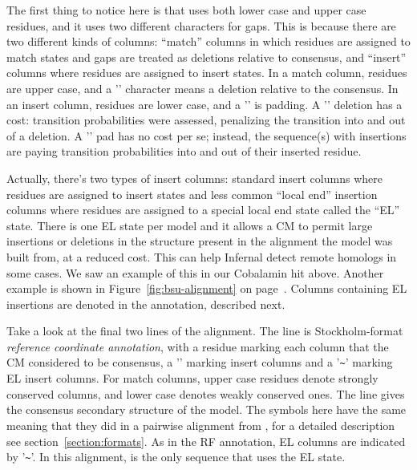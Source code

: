The first thing to notice here is that  uses both lower
case and upper case residues, and it uses two different characters for
gaps. This is because there are two different kinds of columns:
``match'' columns in which residues are assigned to match states and
gaps are treated as deletions relative to consensus, and ``insert''
columns where residues are assigned to insert states.
In a match column, residues are upper case, and a '\otext{-}'
character means a deletion relative to the consensus. In an insert
column, residues are lower case, and a '' is padding.  A '\otext{-}' deletion
has a cost: transition probabilities were assessed, penalizing the
transition into and out of a deletion. A '' pad has no cost per se;
instead, the sequence(s) with insertions are paying transition
probabilities into and out of their inserted residue.

Actually, there's two types of insert columns: standard insert columns
where residues are assigned to insert states and less common ``local end''
insertion columns where residues are assigned to a special local end
state called the ``EL'' state. There is one EL state per model and it
allows a CM to permit large insertions or deletions in the structure
present in the alignment the model was built from, at a reduced
cost. This can help Infernal detect remote homologs in some cases. We
saw an example of this in our Cobalamin  hit
above. Another example is shown in Figure~\ref{fig:bsu-alignment} on
page~\pageref{fig:bsu-alignment}. Columns containing EL insertions are
denoted in the  annotation, described next.

Take a look at the final two lines of the alignment. The  line is Stockholm-format \emph{reference coordinate annotation},
with a residue marking each column that the CM considered to be
consensus, a '' marking insert columns and a '\verb+~+'
marking EL insert columns. For match columns, upper case residues
denote strongly conserved columns, and lower case denotes weakly
conserved ones. The  line gives the consensus
secondary structure of the model. The symbols here have the same
meaning that they did in a pairwise alignment from ,
for a detailed description see section~\ref{section:formats}. As in the
RF annotation, EL columns are indicated by '\verb+~+'. In this
alignment,  is the only sequence that uses the EL
state.

